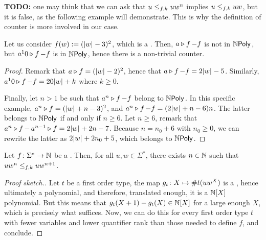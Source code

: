 \textbf{TODO:} one may think that we can ask that $u \resleq{f}{k} u w^n$
implies $u \resleq{f}{k} uw$, but it is false, as the following example will
demonstrate. This is why the definition of counter is more involved in our
case.

\begin{example}
    Let us consider $f(w) \defined (\card{w} - 3)^2$, 
    which is a .
    Then,
    $\app{f}{a} - f$ is not in $\NPoly$,
    but
    $\app{f}{a^10} - f$ is in $\NPoly$,
    hence there is a non-trivial counter.
\end{example}
\begin{proof}
    Remark that $\app{f}{a} = (\card{w} - 2)^2$,
    hence that $\app{f}{a}- f = 2\card{w} - 5$.
    Similarly, $\app{f}{a^10} - f = 20\card{w} + k$ where $k \geq 0$.

    Finally,
    let $n > 1$ be such that
    $\app{f}{a^n} - f$ belong to $\NPoly$.
    In this specific example,
    $\app{f}{a^n} = (\card{w} + n -3)^2$,
    and $\app{f}{a^n} - f = (2 \card{w} + n - 6)n$.
    The latter belongs to $\NPoly$ if and only if
    $n \geq 6$. Let $n \geq 6$, 
    remark that
    $\app{f}{a^n} - \app{f}{a^{n-1}}
    = 2 \card{w} + 2n - 7$. Because $n = n_0 + 6$ with $n_0 \geq 0$,
    we can rewrite the latter 
    as $2 \card{w} + 2n_0 + 5$, which belongs to $\NPoly$.
\end{proof}

\begin{lemma}
    \label{sf-no-periods-on-sequences:lemma}
    Let $f \colon \Sigma^* \to \Nat$ be a . Then,
    for all $u, w \in \Sigma^*$,
    there exists $n \in \Nat$ such that
    $u w^n \resleq{f}{k} u w^{n+1}$.
\end{lemma}
\begin{proof}[Proof sketch.]
    Let $t$ be a first order type,
    the map $g_t \colon X \mapsto \vcount{t}(uw^X)$ is a
     ,
    hence ultimately a polynomial, and therefore,
    translated enough, it is a $\Nat[X]$ polynomial.
    But this means that $g_t(X+1) - g_t(X) \in \Nat[X]$ for a large
    enough $X$, which is precisely what suffices.
    Now, we can do this for every first order type $t$
    with fewer variables and lower quantifier rank than those
    needed to define $f$, and conclude.
\end{proof}

